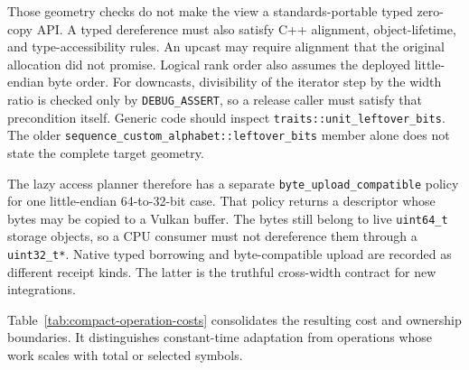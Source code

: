 Those geometry checks do not make the view a standards-portable typed
zero-copy API.  A typed dereference must also satisfy C++ alignment,
object-lifetime, and type-accessibility rules.  An upcast may require alignment
that the original allocation did not promise.  Logical rank order also assumes
the deployed little-endian byte order.  For downcasts, divisibility of the
iterator step by the width ratio is checked only by \texttt{DEBUG\_ASSERT}, so
a release caller must satisfy that precondition itself.  Generic code should
inspect \texttt{traits::unit\_leftover\_bits}.  The older
\texttt{sequence\_custom\_alphabet::leftover\_bits} member alone does not state
the complete target geometry.

The lazy access planner therefore has a separate
\texttt{byte\_upload\_compatible} policy for one little-endian 64-to-32-bit
case.  That policy returns a descriptor whose bytes may be copied to a Vulkan
buffer.  The bytes still belong to live \texttt{uint64\_t} storage objects, so
a CPU consumer must not dereference them through a \texttt{uint32\_t*}.  Native
typed borrowing and byte-compatible upload are recorded as different receipt
kinds.  The latter is the truthful cross-width contract for new integrations.

Table~\ref{tab:compact-operation-costs} consolidates the resulting cost and
ownership boundaries.  It distinguishes constant-time adaptation from
operations whose work scales with total or selected symbols.

